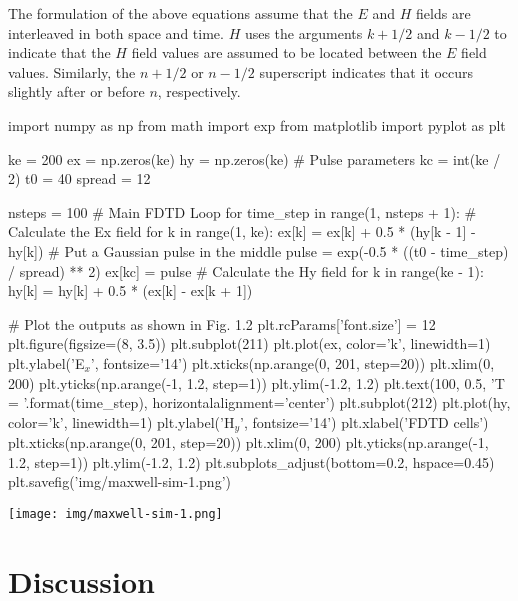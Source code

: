 The formulation of the above equations assume that the $E$ and $H$ fields are interleaved in both
space and time. $H$ uses the arguments $k + 1/2$ and $k - 1/2$ to indicate that the $H$ field values
are assumed to be located between the $E$ field values. Similarly, the $n + 1/2$ or $n - 1/2$
superscript indicates that it occurs slightly after or before $n$, respectively.

\begin{python}
import numpy as np
from math import exp
from matplotlib import pyplot as plt
\end{python}

\begin{python}
ke = 200
ex = np.zeros(ke)
hy = np.zeros(ke)
# Pulse parameters
kc = int(ke / 2)
t0 = 40
spread = 12

nsteps = 100
# Main FDTD Loop
for time_step in range(1, nsteps + 1):
  # Calculate the Ex field
  for k in range(1, ke):
    ex[k] = ex[k] + 0.5 * (hy[k - 1] - hy[k])
  # Put a Gaussian pulse in the middle
  pulse = exp(-0.5 * ((t0 - time_step) / spread) ** 2)
  ex[kc] = pulse
  # Calculate the Hy field
  for k in range(ke - 1):
    hy[k] = hy[k] + 0.5 * (ex[k] - ex[k + 1])

# Plot the outputs as shown in Fig. 1.2
plt.rcParams['font.size'] = 12
plt.figure(figsize=(8, 3.5))
plt.subplot(211)
plt.plot(ex, color='k', linewidth=1)
plt.ylabel('E$_x$', fontsize='14')
plt.xticks(np.arange(0, 201, step=20))
plt.xlim(0, 200)
plt.yticks(np.arange(-1, 1.2, step=1))
plt.ylim(-1.2, 1.2)
plt.text(100, 0.5, 'T = {}'.format(time_step),
horizontalalignment='center')
plt.subplot(212)
plt.plot(hy, color='k', linewidth=1)
plt.ylabel('H$_y$', fontsize='14')
plt.xlabel('FDTD cells')
plt.xticks(np.arange(0, 201, step=20))
plt.xlim(0, 200)
plt.yticks(np.arange(-1, 1.2, step=1))
plt.ylim(-1.2, 1.2)
plt.subplots_adjust(bottom=0.2, hspace=0.45)
plt.savefig('img/maxwell-sim-1.png')
\end{python}

\begin{comment}
\begin{result}
\end{result}
\end{comment}

\begin{center}
\texttt{[image: img/maxwell-sim-1.png]}
\end{center}



\section{Discussion}


